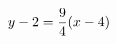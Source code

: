 \documentclass[preview]{standalone}
\begin{document}
\begin{align*}
\special{dvisvgm:raw <g id='unique000'>}y-2=\frac{9}{4}(x-4)\special{dvisvgm:raw </g>}
\end{align*}
\end{document}
